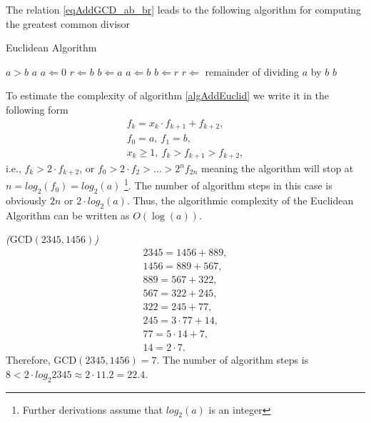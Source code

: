 The relation \eqref{eqAddGCD_ab_br} leads to the following algorithm for computing the greatest common divisor
\begin{algorithm}
\caption{Euclidean Algorithm}
\begin{algorithmic}
    \STATE $a > b$
        \RETURN $a$
    \ENDIF
    \STATE $a \Leftarrow 0$
    \STATE $r \Leftarrow b$
    \STATE $b \Leftarrow a$
    \REPEAT
        \STATE $a \Leftarrow b$
        \STATE $b \Leftarrow r$
        \STATE $r \Leftarrow $ remainder of dividing $a$ by $b$
    \RETURN $b$
\end{algorithmic}
\label{algAddEuclid}
\end{algorithm}

To estimate the complexity of algorithm \ref{algAddEuclid} we write it in the following form
\begin{eqnarray}
f_k = x_k \cdot f_{k + 1} + f_{k + 2},
\nonumber \\
f_0 = a, \: f_1 = b,
\nonumber \\
x_k \ge 1, \: f_k > f_{k+1} > f_{k + 2},
\nonumber
\end{eqnarray}
i.e., $f_k > 2 \cdot f_{k + 2}$, or $f_0 > 2 \cdot f_2 > \dots > 2^nf_{2n}$ meaning the algorithm will stop at $n = log_2\left(f_0\right) = log_2\left(a\right)$
\footnote{Further derivations assume that $log_2\left(a\right)$ is an integer}. The number of algorithm steps in this case is obviously $2n$ or $2 \cdot log_2\left(a\right)$. Thus, the algorithmic complexity of the Euclidean Algorithm can be written as $O\left(\log \left(a\right)\right)$.

\begin{example}
\emph{($\mbox{GCD}\left(2345,1456\right)$)}
\begin{eqnarray}
2345 = 1456 + 889,
\nonumber \\
1456 = 889 + 567,
\nonumber \\
889 = 567 + 322,
\nonumber \\
567 = 322 + 245,
\nonumber \\
322 = 245 + 77,
\nonumber \\
245 = 3 \cdot 77 + 14,
\nonumber \\
77 = 5 \cdot 14 + 7,
\nonumber \\
14 = 2 \cdot 7.
\nonumber
\end{eqnarray}
Therefore, $\mbox{GCD}\left(2345,1456\right) = 7$. 
The number of algorithm steps is $8 < 2 \cdot log_2{2345} \approx 2 \cdot 11.2 = 22.4$.
\nonumber
\end{example}

